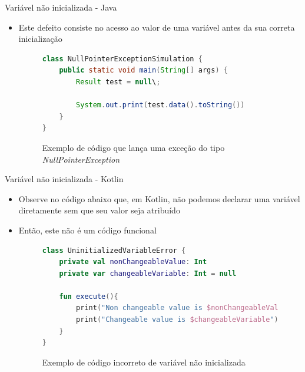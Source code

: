 \documentclass[brazilian]{beamer}
\begin{document}
\begin{frame}[fragile]{Variável não inicializada - Java}
    \begin{itemize}
        \item Este defeito consiste no acesso ao valor de uma variável antes da sua correta inicialização
        \begin{figure}[H]
            \centering
            \begin{lstlisting}[language=Java]
class NullPointerExceptionSimulation {
    public static void main(String[] args) {
        Result test = null\;

        System.out.print(test.data().toString())
    }
}
            \end{lstlisting}
            \caption{Exemplo de código que lança uma exceção do tipo \textit{NullPointerException}}
            \label{fig:java_npe_code}
        \end{figure}
    \end{itemize}
\end{frame}

\begin{frame}[fragile]{Variável não inicializada - Kotlin}
    \begin{itemize}
        \item Observe no código abaixo que, em Kotlin, não podemos declarar uma variável diretamente sem que seu valor seja atribuído
        \item Então, este não é um código funcional
        \begin{figure}[H]
            \centering
            \begin{lstlisting}[language=kotlin]
class UninitializedVariableError {
    private val nonChangeableValue: Int
    private var changeableVariable: Int = null

    fun execute(){
        print("Non changeable value is $nonChangeableValue")
        print("Changeable value is $changeableVariable")
    }
}
            \end{lstlisting}
            \caption{Exemplo de código incorreto de variável não inicializada}
            \label{fig:kotlin_not_init_variable}
        \end{figure}
    \end{itemize}
\end{frame}
\end{document}
